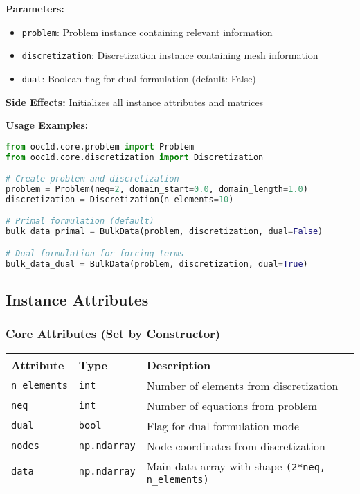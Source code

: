 \textbf{Parameters:}
\begin{itemize}
    \item \texttt{problem}: Problem instance containing relevant information
    \item \texttt{discretization}: Discretization instance containing mesh information
    \item \texttt{dual}: Boolean flag for dual formulation (default: False)
\end{itemize}

\textbf{Side Effects:} Initializes all instance attributes and matrices

\textbf{Usage Examples:}
\begin{lstlisting}[language=Python, caption=Constructor Usage Examples]
from ooc1d.core.problem import Problem
from ooc1d.core.discretization import Discretization

# Create problem and discretization
problem = Problem(neq=2, domain_start=0.0, domain_length=1.0)
discretization = Discretization(n_elements=10)

# Primal formulation (default)
bulk_data_primal = BulkData(problem, discretization, dual=False)

# Dual formulation for forcing terms
bulk_data_dual = BulkData(problem, discretization, dual=True)
\end{lstlisting}

\subsection{Instance Attributes}
\label{subsec:bulk_data_attributes}

\subsubsection{Core Attributes (Set by Constructor)}

\begin{longtable}{|p{3.5cm}|p{2.5cm}|p{7cm}|}
\hline
\textbf{Attribute} & \textbf{Type} & \textbf{Description} \\
\hline
\endhead

\texttt{n\_elements} & \texttt{int} & Number of elements from discretization \\
\hline

\texttt{neq} & \texttt{int} & Number of equations from problem \\
\hline

\texttt{dual} & \texttt{bool} & Flag for dual formulation mode \\
\hline

\texttt{nodes} & \texttt{np.ndarray} & Node coordinates from discretization \\
\hline

\texttt{data} & \texttt{np.ndarray} & Main data array with shape \texttt{(2*neq, n\_elements)} \\
\hline

\end{longtable}

